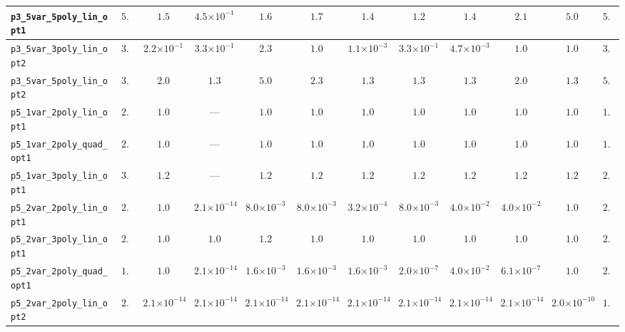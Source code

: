 \begin{landscape}
\begin{table}[H]
{\begin{tabular}{lccccccccccc}
\hline
\texttt{p3\_5var\_5poly\_lin\_opt1} & $5.0$ & $1.5$ & \textbf{$4.5{\scriptstyle\times 10^{-1}}$} & $1.6$ & $1.7$ & $1.4$ & $1.2$ & $1.4$ & $2.1$ & $5.0$ & $5.0$ \\
\hline
\texttt{p3\_5var\_3poly\_lin\_opt2} & $3.0$ & $2.2{\scriptstyle\times 10^{-1}}$ & $3.3{\scriptstyle\times 10^{-1}}$ & $2.3$ & $1.0$ & \textbf{$1.1{\scriptstyle\times 10^{-3}}$} & $3.3{\scriptstyle\times 10^{-1}}$ & $4.7{\scriptstyle\times 10^{-3}}$ & $1.0$ & $1.0$ & $3.0$ \\
\hline
\texttt{p3\_5var\_5poly\_lin\_opt2} & $3.7$ & $2.0$ & \textbf{$1.3$} & $5.0$ & $2.3$ & $1.3$ & $1.3$ & $1.3$ & $2.0$ & $1.3$ & $5.0$ \\
\hline
\texttt{p5\_1var\_2poly\_lin\_opt1} & $2.0$ & \textbf{$1.0$} & --- & \textbf{$1.0$} & \textbf{$1.0$} & \textbf{$1.0$} & \textbf{$1.0$} & \textbf{$1.0$} & \textbf{$1.0$} & $1.0$ & $1.0$ \\
\hline
\texttt{p5\_1var\_2poly\_quad\_opt1} & $2.0$ & \textbf{$1.0$} & --- & \textbf{$1.0$} & \textbf{$1.0$} & \textbf{$1.0$} & \textbf{$1.0$} & \textbf{$1.0$} & \textbf{$1.0$} & \textbf{$1.0$} & $1.0$ \\
\hline
\texttt{p5\_1var\_3poly\_lin\_opt1} & $3.0$ & \textbf{$1.2$} & --- & \textbf{$1.2$} & \textbf{$1.2$} & \textbf{$1.2$} & \textbf{$1.2$} & \textbf{$1.2$} & \textbf{$1.2$} & $1.2$ & $2.2$ \\
\hline
\texttt{p5\_2var\_2poly\_lin\_opt1} & $2.0$ & $1.0$ & \textbf{$2.1{\scriptstyle\times 10^{-14}}$} & $8.0{\scriptstyle\times 10^{-3}}$ & $8.0{\scriptstyle\times 10^{-3}}$ & $3.2{\scriptstyle\times 10^{-4}}$ & $8.0{\scriptstyle\times 10^{-3}}$ & $4.0{\scriptstyle\times 10^{-2}}$ & $4.0{\scriptstyle\times 10^{-2}}$ & $1.0$ & $2.0$ \\
\hline
\texttt{p5\_2var\_3poly\_lin\_opt1} & $2.2$ & $1.0$ & \textbf{$1.0$} & $1.2$ & $1.0$ & $1.0$ & $1.0$ & $1.0$ & $1.0$ & $1.0$ & $2.2$ \\
\hline
\texttt{p5\_2var\_2poly\_quad\_opt1} & $1.2$ & $1.0$ & \textbf{$2.1{\scriptstyle\times 10^{-14}}$} & $1.6{\scriptstyle\times 10^{-3}}$ & $1.6{\scriptstyle\times 10^{-3}}$ & $1.6{\scriptstyle\times 10^{-3}}$ & $2.0{\scriptstyle\times 10^{-7}}$ & $4.0{\scriptstyle\times 10^{-2}}$ & $6.1{\scriptstyle\times 10^{-7}}$ & $1.0$ & $2.0$ \\
\hline
\texttt{p5\_2var\_2poly\_lin\_opt2} & $2.0$ & \textbf{$2.1{\scriptstyle\times 10^{-14}}$} & \textbf{$2.1{\scriptstyle\times 10^{-14}}$} & \textbf{$2.1{\scriptstyle\times 10^{-14}}$} & \textbf{$2.1{\scriptstyle\times 10^{-14}}$} & \textbf{$2.1{\scriptstyle\times 10^{-14}}$} & \textbf{$2.1{\scriptstyle\times 10^{-14}}$} & \textbf{$2.1{\scriptstyle\times 10^{-14}}$} & \textbf{$2.1{\scriptstyle\times 10^{-14}}$} & $2.0{\scriptstyle\times 10^{-10}}$ & $1.0$ \\

\end{tabular}}
\end{table}
\end{landscape}
